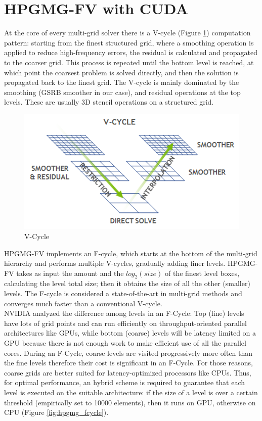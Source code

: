 \documentclass[conference]{IEEEtran}
\begin{document}
\section{HPGMG-FV with CUDA}\label{sec:hpgmg_cuda}

At the core of every multi-grid solver there is a V-cycle (Figure \ref{fig:hpgmg_vcycle}) computation pattern: starting from the finest structured grid, where a smoothing operation is applied to reduce high-frequency errors, the residual is calculated and propagated to the coarser grid. This process is repeated until the bottom level is reached, at which point the coarsest problem is solved directly, and then the solution is propagated back to the finest grid. The V-cycle is mainly dominated by the smoothing (GSRB smoother in our case), and residual operations at the top levels. These are usually 3D stencil operations on a structured grid.

\begin{figure}[h]
\includegraphics[scale=0.7]{hpgmg_v_cycle.png}
\caption{V-Cycle}
\label{fig:hpgmg_vcycle}
\end{figure}

HPGMG-FV implements an F-cycle, which starts at the bottom of the multi-grid hierarchy and performs multiple V-cycles, gradually adding finer levels. 
HPGMG-FV takes as input the amount and the $log_2(size)$ of the finest level boxes, calculating the level total size; then it obtains the size of all the other (smaller) levels.
The F-cycle is considered a state-of-the-art in multi-grid methods and converges much faster than a conventional V-cycle.\\
NVIDIA analyzed the difference among levels in an F-Cycle: Top (fine) levels have lots of grid points and can run efficiently on throughput-oriented parallel architectures like GPUs, while bottom (coarse) levels will be latency limited on a GPU because there is not enough work to make efficient use of all the parallel cores. During an F-Cycle, coarse levels are visited progressively more often than the fine levels therefore their cost is significant in an F-Cycle. For those reasons, coarse grids are better suited for latency-optimized processors like CPUs.
Thus, for optimal performance, an hybrid scheme is required to guarantee that each level is executed on the suitable architecture: if the size of a level is over a certain threshold (empirically set to 10000 elements), then it runs on GPU, otherwise on CPU (Figure \ref{fig:hpgmg_fcycle}).\\
\end{document}
